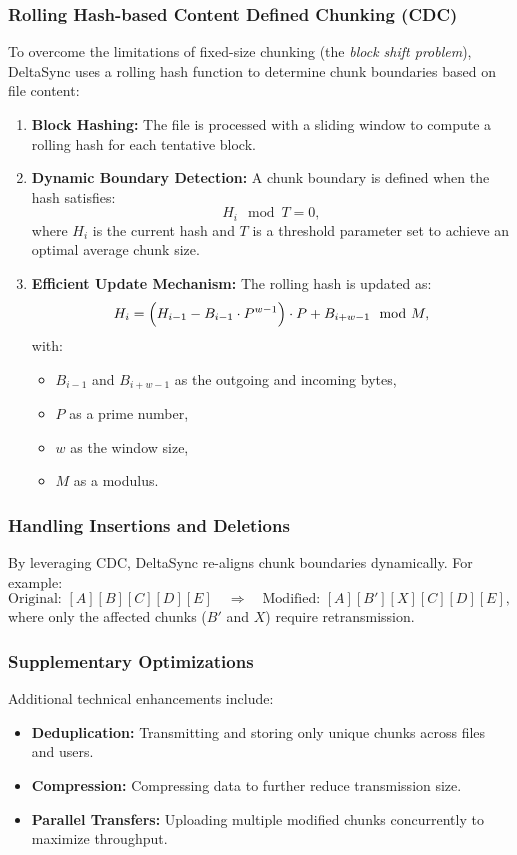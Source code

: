 \subsubsection{Rolling Hash-based Content Defined Chunking (CDC)}
To overcome the limitations of fixed-size chunking (the \emph{block shift problem}), DeltaSync uses a rolling hash function to determine chunk boundaries based on file content:
\begin{enumerate}
    \item \textbf{Block Hashing:} The file is processed with a sliding window to compute a rolling hash for each tentative block.
    \item \textbf{Dynamic Boundary Detection:} A chunk boundary is defined when the hash satisfies:
    \[
        H_i \mod T = 0,
    \]
    where \(H_i\) is the current hash and \(T\) is a threshold parameter set to achieve an optimal average chunk size.
    \item \textbf{Efficient Update Mechanism:} The rolling hash is updated as:
    \[
        H_i = \Bigl( H_{i-1} - B_{i-1} \cdot P^{w-1} \Bigr) \cdot P + B_{i+w-1} \mod M,
    \]
    with:
    \begin{itemize}
        \item \(B_{i-1}\) and \(B_{i+w-1}\) as the outgoing and incoming bytes,
        \item \(P\) as a prime number,
        \item \(w\) as the window size,
        \item \(M\) as a modulus.
    \end{itemize}
\end{enumerate}

\subsubsection{Handling Insertions and Deletions}
By leveraging CDC, DeltaSync re-aligns chunk boundaries dynamically. For example:
\[
\text{Original: } [A][B][C][D][E] \quad \Longrightarrow \quad \text{Modified: } [A][B'] [X] [C][D][E],
\]
where only the affected chunks (\(B'\) and \(X\)) require retransmission.

\subsubsection{Supplementary Optimizations}
Additional technical enhancements include:
\begin{itemize}
    \item \textbf{Deduplication:} Transmitting and storing only unique chunks across files and users.
    \item \textbf{Compression:} Compressing data to further reduce transmission size.
    \item \textbf{Parallel Transfers:} Uploading multiple modified chunks concurrently to maximize throughput.
\end{itemize}

